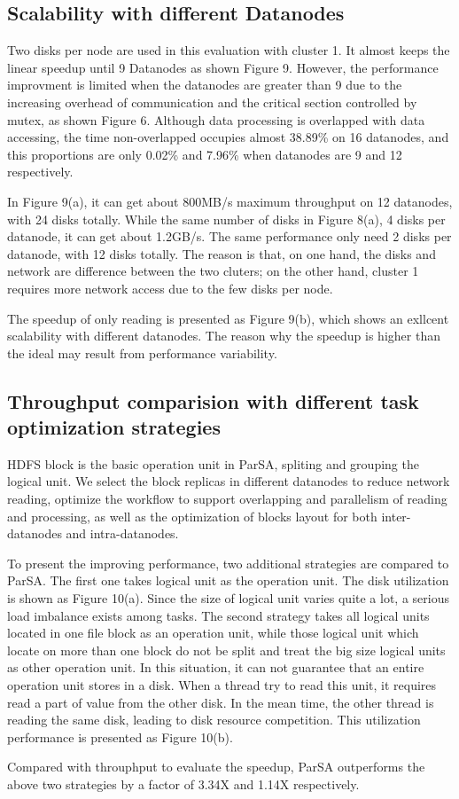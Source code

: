 \documentclass[preprint,12pt]{elsarticle}
\begin{document}
\subsection{Scalability with different Datanodes}
Two disks per node are used in this evaluation with cluster 1. It almost keeps the linear speedup until 9 Datanodes as shown Figure 9. 
However, the performance improvment is limited when the datanodes are greater than 9 due to the increasing overhead of communication
and the critical section controlled by mutex, as shown Figure 6. Although data processing is overlapped with data accessing, the time
non-overlapped occupies almost 38.89\% on 16 datanodes, and this proportions are only 0.02\% and 7.96\% when datanodes are 9 and 12 
respectively. \par
In Figure 9(a), it can get about 800MB/s maximum throughput on 12 datanodes, with 24 disks totally. While the same number of disks in 
Figure 8(a), 4 disks per datanode, it can get about 1.2GB/s. The same performance only need 2 disks per datanode, with 12 disks totally. 
The reason is that, on one hand, the disks and network are difference between the two cluters; on the other hand, cluster 1 requires more 
network access due to the few disks per node.  \par
The speedup of only reading is presented as Figure 9(b), which shows an exllcent scalability with different datanodes. The reason why the
speedup is higher than the ideal may result from performance variability.  

\subsection{Throughput comparision with different task optimization strategies}
HDFS block is the basic operation unit in ParSA, spliting and grouping the logical unit. We select the block replicas in different 
datanodes to reduce network reading, optimize the workflow to support overlapping and parallelism of reading and processing, as well as 
the optimization of blocks layout for both inter-datanodes and intra-datanodes. \par
To present the improving performance, two additional strategies are compared to ParSA. The first one takes logical unit as the operation
unit. The disk utilization is shown as Figure 10(a). Since the size of logical unit varies quite a lot, a serious load imbalance exists 
among tasks. The second strategy takes all logical units located in one file block as an operation unit, while those logical unit which
locate on more than one block do not be split and treat the big size logical units as other operation unit. In this situation, it can not
guarantee that an entire operation unit stores in a disk. When a thread try to read this unit, it requires read a part of value from the
other disk. In the mean time, the other thread is reading the same disk, leading to disk resource competition. This utilization performance
is presented as Figure 10(b). \par
Compared with throuphput to evaluate the speedup, ParSA outperforms the above two strategies by a factor of 3.34X and 1.14X respectively.
\end{document}
